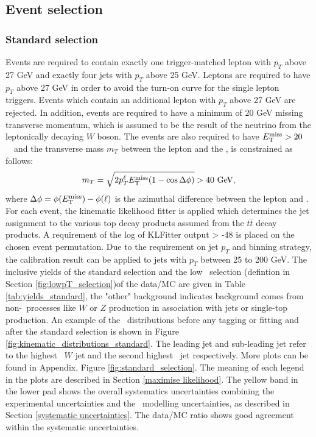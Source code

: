 \documentclass[letterpaper,12pt]{article}
\begin{document}
\subsection{Event selection}
\label{Event selection}


\subsubsection{Standard selection}
\label{standard selection}
Events are required to contain exactly one trigger-matched 
lepton with $p_{T}$ above 27 GeV and exactly four jets with 
$p_{T}$ above 25 GeV. Leptons are required to have $p_{T}$ 
above 27 GeV in order to avoid the turn-on curve for the 
single lepton triggers. Events which contain an additional 
lepton with $p_T$ above 27 GeV are rejected. 
In addition, events are required 
to have a minimum of 20 GeV missing transverse momentum, which is 
assumed to be the result of the neutrino from the leptonically 
decaying $W$ boson. 
The events are also required to have $E_{\mathrm T}^{\mathrm{miss}} > 20$~\GeV\ and the transverse
mass $m_T$ between the lepton and the \MET, is
constrained as follows:
\[ m_T = \sqrt{2 p_T^\ell E_{\mathrm T}^{\mathrm{miss}} (1-\cos\Delta\phi)} > 40~\text{Ge\kern -0.1em V},\]
where $\Delta\phi = \phi(E_{\mathrm T}^{\mathrm{miss}})-\phi(\ell)$ is the azimuthal difference between
the lepton and \MET.
For each event, the kinematic likelihood fitter 
is applied which determines the jet assignment to the various top 
decay products assumed from the $t\bar{t}$ decay products. 
A requirement of the log of KLFitter output > -48 is placed 
on the chosen event permutation. 
Due to the requirement on jet $p_T$ and binning strategy, the calibration 
result can be applied to jets with $p_{T}$ between 25 to 200 GeV. 
The inclusive yields of the standard selection and the low \pt\ selection 
(defintion in Section \ref{fig:lowpT_selection})of the data/MC are 
given in Table \ref{tab:yields_standard}, the "other" background 
indicates background comes from non-\ttbar\ processes like $W$ or $Z$ production
in association with jets or single-top production. An example of 
the \pt\ distributions before any tagging or fitting and 
after the standard selection is shown in Figure \ref{fig:kinematic_distributions_standard}. 
The leading jet and sub-leading jet refer to the highest \pt\ $W$ jet and the 
second highest \pt\ jet respectively.
More plots can be found in Appendix, Figure \ref{fig:standard_selection}.
The meaning of each legend in the plots are described in Section \ref{maximise likelihood}. 
The yellow band in the lower pad shows the overall systematics uncertainties combining the 
experimental uncertainties and the \ttbar\ modelling uncertainties, as described in 
Section \ref{systematic uncertainties}. The data/MC ratio shows good agreement 
within the systematic uncertainties. 
\end{document}
